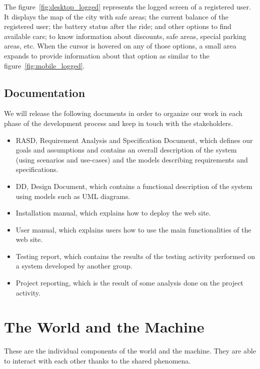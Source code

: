 The figure~\ref{fig:desktop_logged} represents the logged screen of a registered user. It displays the map of the city with safe areas; the current balance of the registered user; the battery status after the ride; and other options to find available cars; to know information about discounts, safe areas, special parking areas, etc. When the cursor is hovered on any of those options, a small area expands to provide information about that option as similar to the figure~\ref{fig:mobile_logged}.

\subsection{Documentation}
We will release the following documents in order to organize our work in each phase of the development process and keep in touch with the stakeholders.
\begin{itemize}
	\item RASD, Requirement Analysis and Specification Document, which defines our goals and assumptions and contains an overall description of the system (using scenarios and use-cases) and the models describing requirements and specifications.
	\item DD, Design Document, which contains a functional description of the system using models such as UML diagrams.
	\item Installation manual, which explains how to deploy the web site.
	\item User manual, which explains users how to use the main functionalities of the web site.
	\item Testing report, which contains the results of the testing activity performed on a system developed by another group.
	\item Project reporting, which is the result of some analysis done on the project activity.
\end{itemize}

\clearpage
\section{The World and the Machine}
These are the individual components of the world and the machine. They are able to interact with each other thanks to the shared phenomena.

